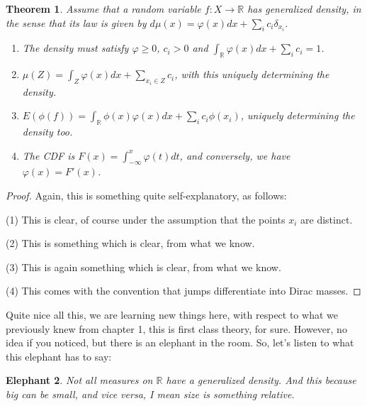 \documentclass[12pt]{amsbook}
\newtheorem{theorem}{Theorem}[chapter]
\newtheorem{elephant}[theorem]{Elephant}
\begin{document}

\begin{theorem}
Assume that a random variable $f:X\to\mathbb R$ has generalized density, in the sense that its law is given by $d\mu(x)=\varphi(x)dx+\sum_ic_i\delta_{x_i}$.
\begin{enumerate}
\item The density must satisfy $\varphi\geq0$, $c_i>0$ and $\int_\mathbb R\varphi(x)dx+\sum_ic_i=1$.

\item $\mu(Z)=\int_Z\varphi(x)dx+\sum_{x_i\in Z}c_i$, with this uniquely determining the density.

\item $E(\phi(f))=\int_\mathbb R\phi(x)\varphi(x)dx+\sum_ic_i\phi(x_i)$, uniquely determining the density too.

\item The CDF is $F(x)=\int_{-\infty}^x\varphi(t)dt$, and conversely, we have $\varphi(x)=F'(x)$.
\end{enumerate}
\end{theorem}

\begin{proof}
Again, this is something quite self-explanatory, as follows:

\medskip

(1) This is clear, of course under the assumption that the points $x_i$ are distinct.

\medskip

(2) This is something which is clear, from what we know.

\medskip

(3) This is again something which is clear, from what we know.

\medskip

(4) This comes with the convention that jumps differentiate into Dirac masses.
\end{proof}

Quite nice all this, we are learning new things here, with respect to what we previously knew from chapter 1, this is first class theory, for sure. However, no idea if you noticed, but there is an elephant in the room. So, let's listen to what this elephant has to say:

\begin{elephant}
Not all measures on $\mathbb R$ have a generalized density. And this because big can be small, and vice versa, I mean size is something relative.
\end{elephant}
\end{document}
